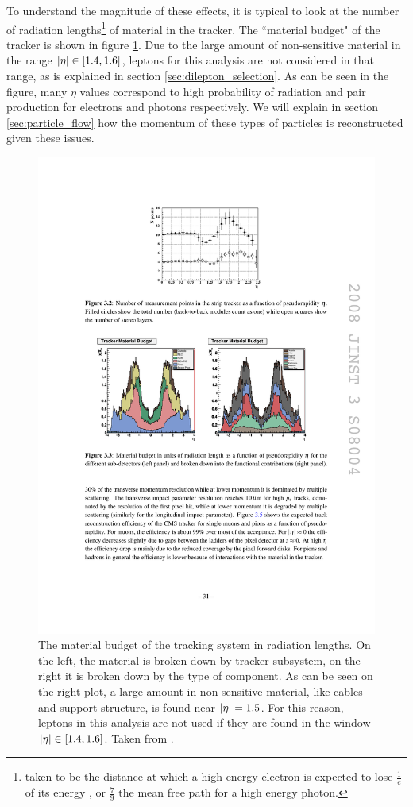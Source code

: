     To understand the magnitude of these effects, it is typical to look at the number of radiation lengths\footnote{taken to be the distance at which a high energy electron is expected to lose $\frac{1}{e}$ of its energy \cite[sec 34.4.2]{PDG}, or $\frac{7}{9}$ the mean free path for a high energy photon.} of material in the tracker. The ``material budget" of the tracker is shown in figure \ref{fig:tracker_material_budget}. Due to the large amount of non-sensitive material in the range $\lvert \eta \rvert \in [1.4,1.6]$, leptons for this analysis are not considered in that range, as is explained in section \ref{sec:dilepton_selection}. As can be seen in the figure, many $\eta$ values correspond to high probability of radiation and pair production for electrons and photons respectively. We will explain in section \ref{sec:particle_flow} how the momentum of these types of particles is reconstructed given these issues.

    \begin{figure}[h!]
      \centering
      \includegraphics[width=.9\textwidth]{figures/cms_tracker_material_budget.pdf}
      \caption{The material budget of the tracking system in radiation lengths. On the left, the material is broken down by tracker subsystem, on the right it is broken down by the type of component. As can be seen on the right plot, a large amount in non-sensitive material, like cables and support structure, is found near $\lvert \eta \rvert=1.5$. For this reason, leptons in this analysis are not used if they are found in the window $\lvert \eta \rvert \in [1.4,1.6]$. Taken from \cite{cms_jinst}.}
      \label{fig:tracker_material_budget}
    \end{figure}

